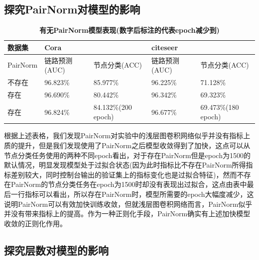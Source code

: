 \documentclass{article}
\begin{document}
	\subsection{探究PairNorm对模型的影响}
	\begin{table}[!ht]
		\caption{\textbf{有无PairNorm模型表现(数字后标注的代表epoch减少到)}}%
		\centering%
		\begin{tabular}{|l|ll|ll|}
			\hline
			数据集 & \multicolumn{2}{l|}{Cora} & \multicolumn{2}{l|}{citeseer} \\ \hline
			PairNorm  & 链路预测(AUC)   & 节点分类(ACC)   & 链路预测(AUC)     & 节点分类(ACC)     \\ \hline
			不存在   &  96.823\%       &   85.977\%     & 96.225\%             & 71.128\%              \\
			存在   &  96.690\%       &  80.442\%      & 96.342\%            & 69.323\%              \\
			存在   &  96.824\%       &  84.132\%(200 epoch)      & 96.677\%           & 69.473\%(180 epoch)              \\ \hline 
		\end{tabular}
	\end{table}
	根据上述表格，我们发现PairNorm对实验中的浅层图卷积网络似乎并没有指标上质的提升，但是我们发现使用了PairNorm之后模型收敛得到了加快，这点可以从节点分类任务使用的两种不同epoch看出，对于存在PairNorm但是epoch为1500的默认情况，明显发现模型处于过拟合状态(因为此时指标比不存在PairNorm所得指标差别较大，同时控制台输出的验证集上的指标变化也是过拟合特征)，然而不存在PairNorm的节点分类任务在epoch为1500时却没有表现出过拟合，这点由表中最后一行指标可以看出，所以存在PairNorm时，模型所需要的epoch大幅度减少，这说明PairNorm可以有效加快训练收敛，但就浅层图卷积网络而言，PairNorm似乎并没有带来指标上的提高。作为一种正则化手段，PairNorm确实有上述加快模型收敛的正则化作用。
	\subsection{探究层数对模型的影响}
	
\end{document}

